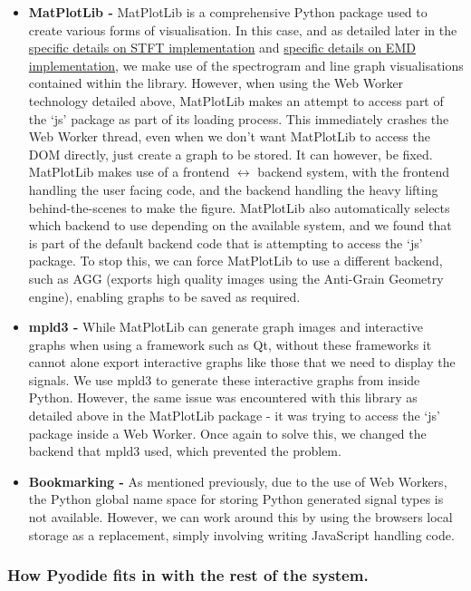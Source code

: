 \begin{itemize}
    \item {\bf MatPlotLib - } MatPlotLib is a comprehensive Python package used to create various forms of visualisation. In this case, and as detailed later in the 
    \hyperref[stftsection]{specific details on STFT implementation} and \hyperref[emdsection]{specific details on EMD implementation}, we make use of the spectrogram
    and line graph visualisations contained within the library. However, when using the Web Worker technology detailed above, MatPlotLib makes an attempt to access part of the `js' package
    as part of its loading process. This immediately crashes the Web Worker thread, even when we don't want MatPlotLib to access the DOM directly, just create a graph to be stored.
    It can however, be fixed. MatPlotLib makes use of a frontend $ \leftrightarrow $ backend system,  with the frontend handling
    the user facing code, and the backend handling the heavy lifting behind-the-scenes to make the figure. MatPlotLib also automatically selects which backend to use depending on the available
    system, and we found that is part of the default backend code that is attempting to access the `js' package. 
    To stop this, we can force MatPlotLib to use a different backend, such as AGG (exports high quality images using the Anti-Grain Geometry engine), enabling graphs to be saved as required.

    \item {\bf mpld3 - } While MatPlotLib can generate graph images and interactive graphs when using a framework such as Qt, without these frameworks it cannot alone export interactive graphs
    like those that we need to display the signals. We use mpld3 to generate these interactive graphs from inside Python. However, the same issue was encountered with this library as detailed above in the
    MatPlotLib package - it was trying to access the `js' package inside a Web Worker. Once again to solve this, we changed the backend that mpld3 used, which prevented the problem.

    \item {\bf Bookmarking - } As mentioned previously, due to the use of Web Workers, the Python global name space for storing Python generated signal types is not available. However, 
    we can work around this by using the browsers local storage as a replacement, simply involving writing JavaScript handling code.
\end{itemize}


\subsubsection{How Pyodide fits in with the rest of the system.}

